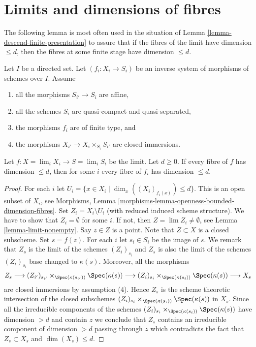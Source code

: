 \section{Limits and dimensions of fibres}
\label{section-limits-dimension}

\noindent
The following lemma is most often used in the situation of
Lemma \ref{lemma-descend-finite-presentation}
to assure that if the fibres of the limit have dimension $\leq d$,
then the fibres at some finite stage have dimension $\leq d$.

\begin{lemma}
\label{lemma-limit-dimension}
Let $I$ be a directed set.
Let $(f_i : X_i \to S_i)$ be an inverse system of morphisms of schemes
over $I$. Assume
\begin{enumerate}
\item all the morphisms $S_{i'} \to S_i$ are affine,
\item all the schemes $S_i$ are quasi-compact and quasi-separated,
\item the morphisms $f_i$ are of finite type, and
\item the morphisms $X_{i'} \to X_i \times_{S_i} S_{i'}$ are closed
immersions.
\end{enumerate}
Let $f : X = \lim_i X_i \to S = \lim_i S_i$ be the limit.
Let $d \geq 0$.
If every fibre of $f$ has dimension $\leq d$, then for some $i$
every fibre of $f_i$ has dimension $\leq d$.
\end{lemma}

\begin{proof}
For each $i$ let $U_i = \{x \in X_i \mid \dim_x((X_i)_{f_i(x)}) \leq d\}$.
This is an open subset of $X_i$, see
Morphisms, Lemma \ref{morphisms-lemma-openness-bounded-dimension-fibres}.
Set $Z_i = X_i \setminus U_i$ (with reduced induced scheme structure).
We have to show that $Z_i = \emptyset$ for some $i$.
If not, then $Z = \lim Z_i \not = \emptyset$, see
Lemma \ref{lemma-limit-nonempty}.
Say $z \in Z$ is a point. Note that $Z \subset X$ is a closed subscheme.
Set $s = f(z)$. For each $i$ let $s_i \in S_i$ be the image
of $s$. We remark that $Z_s$ is the limit of the schemes $(Z_i)_{s_i}$
and $Z_s$ is also the limit of the schemes $(Z_i)_{s_i}$ base
changed to $\kappa(s)$. Moreover, all the morphisms
$$
Z_s
\longrightarrow
(Z_{i'})_{s_{i'}} \times_{\Spec(\kappa(s_{i'}))} \Spec(\kappa(s))
\longrightarrow
(Z_i)_{s_i} \times_{\Spec(\kappa(s_i))} \Spec(\kappa(s))
\longrightarrow
X_s
$$
are closed immersions by assumption (4). Hence $Z_s$ is the scheme
theoretic intersection of the closed subschemes
$(Z_i)_{s_i} \times_{\Spec(\kappa(s_i))} \Spec(\kappa(s))$
in $X_s$. Since all the irreducible components of the schemes
$(Z_i)_{s_i} \times_{\Spec(\kappa(s_i))} \Spec(\kappa(s))$
have dimension $> d$ and contain $z$ we conclude that
$Z_s$ contains an irreducible component of dimension $> d$ passing
through $z$ which contradicts the fact that $Z_s \subset X_s$ and
$\dim(X_s) \leq d$.
\end{proof}

